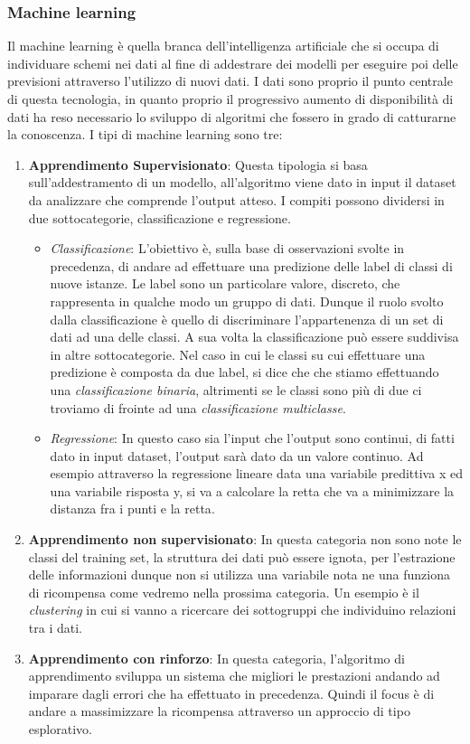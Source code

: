 \subsubsection{Machine learning}
Il machine learning è quella branca dell'intelligenza artificiale che si occupa di individuare schemi nei dati al fine di addestrare dei modelli per eseguire poi delle previsioni attraverso l'utilizzo di nuovi dati. I dati sono proprio il punto centrale di questa tecnologia, in quanto proprio il progressivo aumento di disponibilità di dati ha reso necessario lo sviluppo di algoritmi che fossero in grado di catturarne la conoscenza. I tipi di machine learning sono tre: 
\begin{enumerate}
    \item \textbf{Apprendimento Supervisionato}: Questa tipologia si basa sull'addestramento di un modello, all'algoritmo viene dato in input il dataset da analizzare che comprende l'output atteso. I compiti possono dividersi in due sottocategorie, classificazione e regressione. 
    \begin{itemize}
        \item \textit{Classificazione}: L'obiettivo è, sulla base di osservazioni svolte in precedenza, di andare ad effettuare una predizione delle label di classi di nuove istanze. Le label sono un particolare valore, discreto, che rappresenta in qualche modo un gruppo di dati. Dunque il ruolo svolto dalla classificazione è quello di discriminare l'appartenenza di un set di dati ad una delle classi. A sua volta la classificazione può essere suddivisa in altre sottocategorie. Nel caso in cui le classi su cui effettuare una predizione è composta da due label, si dice che che stiamo effettuando una \textit{classificazione binaria}, altrimenti se le classi sono più di due ci troviamo di frointe ad una \textit{classificazione multiclasse}. 
        
        \item \textit{Regressione}: In questo caso sia l'input che l'output sono continui, di fatti dato in input dataset, l'output sarà dato da un valore continuo. Ad esempio attraverso la regressione lineare data una variabile predittiva x ed una variabile risposta y, si va a calcolare la retta che va a minimizzare la distanza fra i punti e la retta\cite{pyML}.
    \end{itemize}
    \item \textbf{Apprendimento non supervisionato}: In questa categoria non sono note le classi del training set, la struttura dei dati può essere ignota, per l'estrazione delle informazioni dunque non si utilizza una variabile nota ne una funziona di ricompensa come vedremo nella prossima categoria. Un esempio è il \textit{clustering} in cui si vanno a ricercare dei sottogruppi che individuino relazioni tra i dati. 
    \item \textbf{Apprendimento con rinforzo}: In questa categoria, l'algoritmo di apprendimento sviluppa un sistema che migliori le prestazioni andando ad imparare dagli errori che ha effettuato in precedenza. Quindi il focus è di andare a massimizzare la ricompensa attraverso un approccio di tipo esplorativo. 
    
\end{enumerate}
